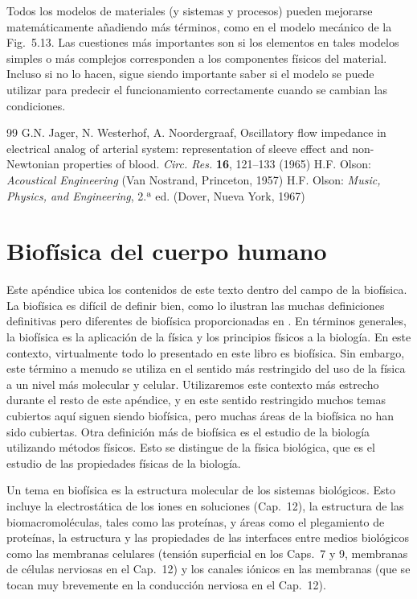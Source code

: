 \documentclass[12pt,a4paper]{book}
\begin{document}
Todos los modelos de materiales (y sistemas y procesos) pueden mejorarse matemáticamente añadiendo más términos, como en el modelo mecánico de la Fig.~5.13. Las cuestiones más importantes son si los elementos en tales modelos simples o más complejos corresponden a los componentes físicos del material. Incluso si no lo hacen, sigue siendo importante saber si el modelo se puede utilizar para predecir el funcionamiento correctamente cuando se cambian las condiciones.

\begin{thebibliography}{99}
 G.N. Jager, N. Westerhof, A. Noordergraaf, Oscillatory flow impedance in electrical analog of arterial system: representation of sleeve effect and non-Newtonian properties of blood. \textit{Circ. Res.} \textbf{16}, 121--133 (1965)
 H.F. Olson: \textit{Acoustical Engineering} (Van Nostrand, Princeton, 1957)
 H.F. Olson: \textit{Music, Physics, and Engineering}, 2.ª ed. (Dover, Nueva York, 1967)
\end{thebibliography}



\chapter{Biofísica del cuerpo humano}
\label{ch:appendixE}

Este apéndice ubica los contenidos de este texto dentro del campo de la biofísica. La biofísica es difícil de definir bien, como lo ilustran las muchas definiciones definitivas pero diferentes de biofísica proporcionadas en \cite{E1,E2,E3,E4,E5,E6,E7,E8,E9,E10,E11,E12}. En términos generales, la biofísica es la aplicación de la física y los principios físicos a la biología. En este contexto, virtualmente todo lo presentado en este libro es biofísica. Sin embargo, este término a menudo se utiliza en el sentido más restringido del uso de la física a un nivel más molecular y celular. Utilizaremos este contexto más estrecho durante el resto de este apéndice, y en este sentido restringido muchos temas cubiertos aquí siguen siendo biofísica, pero muchas áreas de la biofísica no han sido cubiertas. Otra definición más de biofísica es el estudio de la biología utilizando métodos físicos. Esto se distingue de la física biológica, que es el estudio de las propiedades físicas de la biología.

Un tema en biofísica es la estructura molecular de los sistemas biológicos. Esto incluye la electrostática de los iones en soluciones (Cap.~12), la estructura de las biomacromoléculas, tales como las proteínas, y áreas como el plegamiento de proteínas, la estructura y las propiedades de las interfaces entre medios biológicos como las membranas celulares (tensión superficial en los Caps.~7 y 9, membranas de células nerviosas en el Cap.~12) y los canales iónicos en las membranas (que se tocan muy brevemente en la conducción nerviosa en el Cap.~12).
\end{document}
